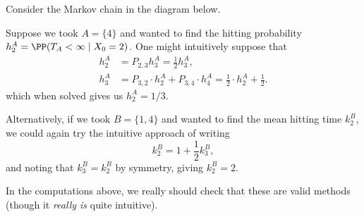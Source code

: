 \documentclass[a4paper]{scrartcl}
\begin{document}
\begin{example}
	Consider the Markov chain in the diagram below.
	\begin{center}
		\end{center}

		Suppose we took $A = \{4\}$ and wanted to find the hitting probability $h_2^A = \PP(T_A < \infty \mid X_0 = 2)$. One might intuitively suppose that
		\begin{align*}
			h_2^A &= P_{2, 3} h_3^A = \frac{1}{2} h_3^A, \\
			h_3^A &= P_{3, 2} \cdot h_2^A + P_{3, 4} \cdot h_4^A = \frac{1}{2} \cdot h_2^A + \frac{1}{2}.
		\end{align*}
		which when solved gives us $h_2^A = 1/3$.

		Alternatively, if we took $B = \{1, 4\}$ and wanted to find the mean hitting time $k_2^B$, we could again try the intuitive approach of writing
		$$
		k_2^B = 1 + \frac{1}{2}k_3^B,
		$$
		and noting that $k_3^B = k_2^B$ by symmetry, giving $k_2^B = 2$.
\end{example}

In the computations above, we really should check that these are valid methods (though it \emph{really is} quite intuitive).
\end{document}
